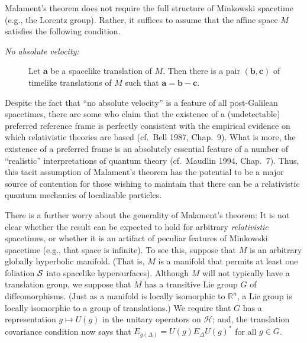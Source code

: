 \documentclass[11pt]{article}
\theoremstyle{remark}
\newcommand{\hil}[1]{\mathcal{#1}}
\begin{document}
Malament's theorem does not require the full structure of Minkowski
spacetime (e.g., the Lorentz group).  Rather, it suffices to assume
that the affine space $M$ satisfies the following condition.
\begin{description}
\item[{\it No absolute velocity:}] Let $\mathbf{a}$ be a spacelike
  translation of $M$.  Then there is a pair $(\mathbf{b},\mathbf{c})$
  of timelike translations of $M$ such that
  $\mathbf{a}=\mathbf{b}-\mathbf{c}$.
\end{description}
Despite the fact that ``no absolute velocity'' is a feature of all
post-Galilean spacetimes, there are some who claim that the existence
of a (undetectable) preferred reference frame is perfectly consistent
with the empirical evidence on which relativistic theories are based
(cf.~Bell 1987, Chap.~9).  What is more, the existence of a preferred
frame is an absolutely essential feature of a number of ``realistic''
interpretations of quantum theory (cf.~Maudlin 1994, Chap.~7).  Thus,
this tacit assumption of Malament's theorem has the potential to be a
major source of contention for those wishing to maintain that there
can be a relativistic quantum mechanics of localizable particles.

There is a further worry about the generality of Malament's theorem:
It is not clear whether the result can be expected to hold for
arbitrary \emph{relativistic} spacetimes, or whether it is an artifact
of peculiar features of Minkowski spacetime (e.g., that space is
infinite).  To see this, suppose that $M$ is an arbitrary globally
hyperbolic manifold.  (That is, $M$ is a manifold that permits at
least one foliation $\cal{S}$ into spacelike hypersurfaces).  Although
$M$ will not typically have a translation group, we suppose that $M$
has a transitive Lie group $G$ of diffeomorphisms.  (Just as a
manifold is locally isomorphic to $\mathbb{R}^{n}$, a Lie group is
locally isomorphic to a group of translations.)  We require that $G$
has a representation $g\mapsto U(g)$ in the unitary operators on
$\hil{H}$; and, the translation covariance condition now says that
$E_{g(\Delta )}=U(g)E_{\Delta}U(g)^{*}$ for all $g\in G$.
\end{document}
